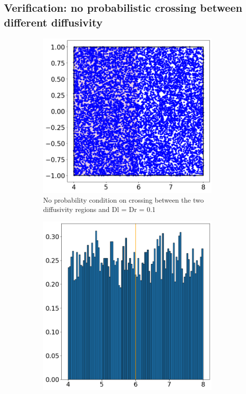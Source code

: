 \documentclass{article}
\begin{document}
\FloatBarrier  %
\subsection{Verification: no probabilistic crossing between different diffusivity}
\begin{figure}[htbp]
    \centering
    \begin{subfigure}[b]{0.45\textwidth}
        \centering
        \includegraphics[width=\textwidth]{images/positionsDl01Dr01Rl0Rr0.png}
        \caption{No probability condition on crossing between the two diffusivity regions and Dl = Dr = 0.1}
    \end{subfigure}
    \hfill
    \begin{subfigure}[b]{0.45\textwidth}
        \centering
        \includegraphics[width=\textwidth]{images/histDl01Dr01Rl0Rr0.png}

\end{subfigure}
\end{figure}
\end{document}
